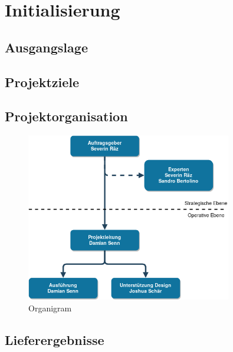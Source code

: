 \chapter{Initialisierung}

\label{ReportInitialisierung}

\section{Ausgangslage}

\section{Projektziele}



\clearpage

\section{Projektorganisation}

\begin{figure}[!htb]
  \centering
  \includegraphics[width=0.8\textwidth]{figures/organigram.png}
  \caption{Organigram}
\end{figure}



\section{Lieferergebnisse}

